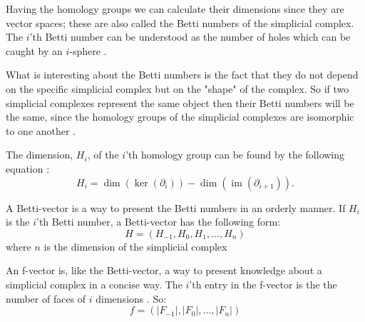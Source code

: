 \documentclass[11pt,a4paper,twoside]{report}
\DeclareMathOperator{\im}{im}
\begin{document}
Having the homology groups we can calculate their dimensions since they are vector spaces; these are also called the Betti numbers of the simplicial complex. The $i$'th Betti number can be understood as the number of holes which can be caught by an $i$-sphere \cite{wikiBetti}.

What is interesting about the Betti numbers is the fact that they do not depend on the  specific simplicial complex but on the "shape" of the complex. So if two simplicial complexes represent the same object then their Betti numbers will be the same, since the homology groups of the simplicial complexes are isomorphic to one another \cite[p. 70]{Edelsbrunner}. 

The dimension, $H_i$, of the $i$'th homology group can be found by the following equation \cite[p.2]{Allgaier}:
\begin{equation}\label{eq:homology_group}
H_i = \dim(\ker(\partial_i))-\dim(\im(\partial_{i+1})).
\end{equation}

A Betti-vector is a way to present the Betti numbers in an orderly manner. If $H_i$ is the $i$'th Betti number, a Betti-vector has the following form:
\begin{equation*}
H = (H_{-1},H_0,H_1,\dots,H_n)
\end{equation*}
where $n$ is the dimension of the simplicial complex

An f-vector is, like the Betti-vector, a way to present knowledge about a simplicial complex in a concise way. The $i$'th entry in the f-vector is the the number of faces of $i$ dimensions \cite[p.15]{Jonsson}. So:
\begin{equation*}
f = (|F_{-1}|,|F_0|,\dots,|F_n|)
\end{equation*}
\end{document}
